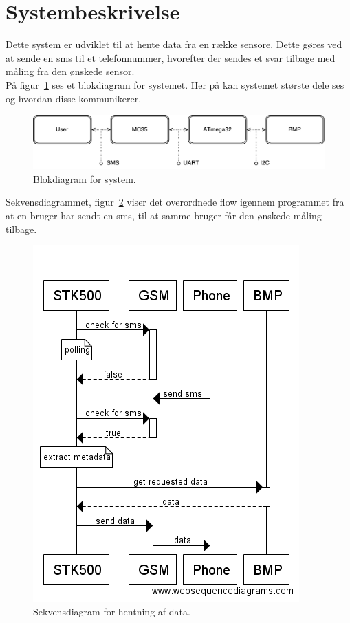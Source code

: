 \section{Systembeskrivelse}
	
Dette system er udviklet til at hente data fra en række sensore. Dette gøres ved at sende en sms til et telefonnummer, hvorefter der sendes et svar tilbage med måling fra den ønskede sensor.\\

På figur~\ref{fig:blockdiagram} ses et blokdiagram for systemet. Her på kan systemet største dele ses og hvordan disse kommunikerer.

\vskip 0.5cm
\begin{figure}[h]
	\centering
	\includegraphics[width=\linewidth]{figs/blockdiagram.pdf}
	\caption{Blokdiagram for system.}
	\label{fig:blockdiagram}
\end{figure}
\vskip 0.5cm

Sekvensdiagrammet, figur~\ref{fig:seq-getdata} viser det overordnede flow igennem programmet fra at en bruger har sendt en sms, til at samme bruger får den ønskede måling tilbage.

\begin{figure}[h]
	\centering
	\includegraphics[width=0.56\linewidth]{figs/seq-getdata.png}
	\caption{Sekvensdiagram for hentning af data.}
	\label{fig:seq-getdata}
\end{figure}


